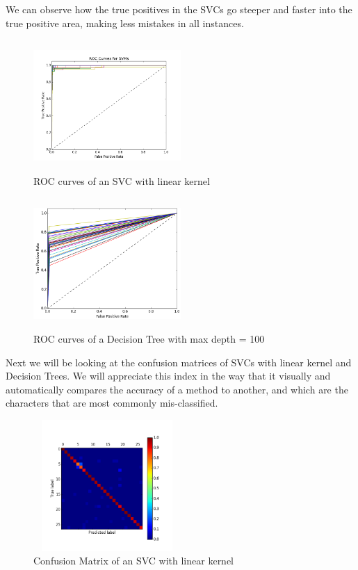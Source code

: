 \documentclass{article}
\begin{document}
We can observe how the true positives in the SVCs go steeper and faster into the true positive area, making less mistakes in all instances.
\begin{figure}[H]
	\centering
	\includegraphics[width=0.5\textwidth, height= 5cm]{roc_svm_francisco__svm.png}
	\caption{ROC curves of an SVC with linear kernel}
\end{figure} 
\begin{figure}[H]
	\centering
	\includegraphics[width=0.5\textwidth, height= 5cm]{roc_tree1_dt.png}
	\caption{ROC curves of a Decision Tree with max depth = 100}
\end{figure} 
Next we will be looking at the confusion matrices of SVCs with linear kernel and Decision Trees. We will appreciate this index in the way that it visually and automatically compares the accuracy of a method to another, and which are the characters that are most commonly mis-classified.
\begin{figure}[H]
	\centering
	\includegraphics[width=0.5\textwidth, height= 5cm]{cm_svm_francisco__svm.png}
	\caption{Confusion Matrix of an SVC with linear kernel}
\end{figure} 
\end{document}
